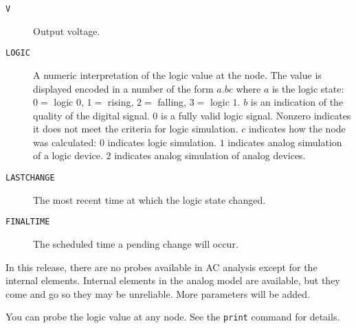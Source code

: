 \begin{description}

\item[{\tt V}]
Output voltage.

\item[{\tt LOGIC}]
A numeric interpretation of the logic value at the node.  The value is
displayed encoded in a number of the form $a.bc$ where $a$ is the
logic state: $0 =$ logic $0$, $1 =$ rising, $2 =$ falling, $3 =$ logic
$1$.  $b$ is an indication of the quality of the digital signal.  $0$
is a fully valid logic signal.  Nonzero indicates it does not meet the
criteria for logic simulation.  $c$ indicates how the node was
calculated: $0$ indicates logic simulation.  $1$ indicates analog
simulation of a logic device.  $2$ indicates analog simulation of
analog devices.

\item[{\tt LASTCHANGE}]
The most recent time at which the logic state changed.

\item[{\tt FINALTIME}]
The scheduled time a pending change will occur.

\end{description}

In this release, there are no probes available in AC analysis except for the
internal elements.  Internal elements in the analog model are available, but
they come and go so they may be unreliable.  More parameters will be added.

You can probe the logic value at any node.  See the {\tt print} command for
details.
